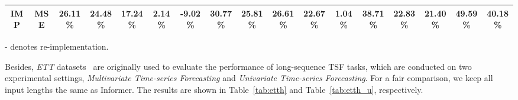 \documentclass{article}
\begin{document}
\begin{table*}[htbp]
\begin{threeparttable}
{\begin{tabular}{c|c|c|c|c|c|c|c|c|c|c|c|c|c|c|c|c}
\textbf{IMP} & MSE           & {\color[RGB]{230, 57, 70}  26.11\%}                                          & {\color[RGB]{230, 57, 70}  24.48\%}                                             & {\color[RGB]{230, 57, 70}  17.24\%}                                           & {\color[RGB]{230, 57, 70}  2.14\%}                                             & {\color[RGB]{230, 57, 70}  -9.02\%}                                             & {\color[RGB]{230, 57, 70}  30.77\%}                                             & {\color[RGB]{230, 57, 70}  25.81\%}                                             & {\color[RGB]{230, 57, 70}  26.61\%}                                            & {\color[RGB]{230, 57, 70}  22.67\%}                                          & {\color[RGB]{230, 57, 70}  1.04\%}                                            & {\color[RGB]{230, 57, 70}  38.71\%}                                            & {\color[RGB]{230, 57, 70}  22.83\%}                                           & {\color[RGB]{230, 57, 70}  21.40\%}                                           & {\color[RGB]{230, 57, 70}  49.59\%}                                           & {\color[RGB]{230, 57, 70}  40.18\%}\\ \hline
\end{tabular}}
\begin{tablenotes} \tiny
		\item -  denotes re-implementation. \hspace{10pt}
 \end{tablenotes} 

\end{threeparttable} \label{tab:etth}
\end{table*}

Besides, \textit{ETT} datasets~\citep{Zhou2020InformerBE} are originally used to evaluate the performance of long-sequence TSF tasks, which are conducted on two experimental settings, \emph{Multivariate Time-series Forecasting} and \emph{Univariate Time-series Forecasting}. For a fair comparison, we keep all input lengths  the same as Informer. The results are shown in Table~\ref{tab:etth} and Table~\ref{tab:etth_u}, respectively. 
\end{document}

